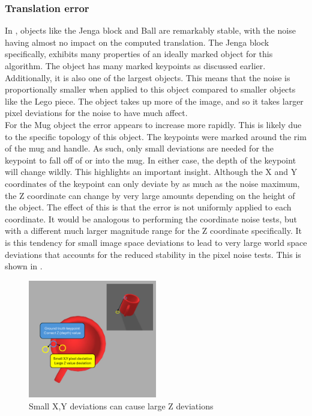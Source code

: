 \subsubsection{Translation error}
In , objects like the Jenga block and Ball are remarkably stable, with the noise having almost no impact on the computed translation. The Jenga block specifically, exhibits many properties of an ideally marked object for this algorithm. The object has many marked keypoints as discussed earlier. Additionally, it is also one of the largest objects. This means that the noise is proportionally smaller when applied to this object compared to smaller objects like the Lego piece. The object takes up more of the image, and so it takes larger pixel deviations for the noise to have much affect.\\

For the Mug object the error appears to increase more rapidly. This is likely due to the specific topology of this object. The keypoints were marked around the rim of the mug and handle. As such, only small deviations are needed for the keypoint to fall off of or into the mug. In either case, the depth of the keypoint will change wildly. This highlights an important insight. Although the X and Y coordinates of the keypoint can only deviate by as much as the noise maximum, the Z coordinate can change by very large amounts depending on the height of the object. The effect of this is that the error is not uniformly applied to each coordinate. It would be analogous to performing the coordinate noise tests, but with a different much larger magnitude range for the Z coordinate specifically. It is this tendency for small image space deviations to lead to very large world space deviations that accounts for the reduced stability in the pixel noise tests. This is shown in .\\

\begin{figure}[h]
    \centering
    \includegraphics[width=0.5\textwidth]{figures/unstableZ.png}
    \caption{Small X,Y deviations can cause large Z deviations}
    \label{fig:unstableZ}
\end{figure}


